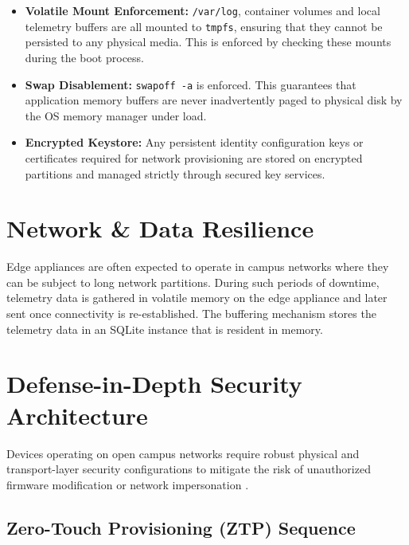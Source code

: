\documentclass[conference]{IEEEtran}
\begin{document}
\begin{itemize}
    \item \textbf{Volatile Mount Enforcement:} \texttt{/var/log}, container volumes and local telemetry buffers are all mounted to \texttt{tmpfs}, ensuring that they cannot be persisted to any physical media. This is enforced by checking these mounts during the boot process.
    \item \textbf{Swap Disablement:} \texttt{swapoff -a} is enforced. This guarantees that application memory buffers are never inadvertently paged to physical disk by the OS memory manager under load.
    \item \textbf{Encrypted Keystore:} Any persistent identity configuration keys or certificates required for network provisioning are stored on encrypted partitions and managed strictly through secured key services.
\end{itemize}

\section{Network \& Data Resilience}

Edge appliances are often expected to operate in campus networks where they can be subject to long network partitions. During such periods of downtime, telemetry data is gathered in volatile memory on the edge appliance and later sent once connectivity is re-established. The buffering mechanism stores the telemetry data in an SQLite instance that is resident in memory.

\section{Defense-in-Depth Security Architecture}

Devices operating on open campus networks require robust physical and transport-layer security configurations to mitigate the risk of unauthorized firmware modification or network impersonation \cite{b16}.

\subsection{Zero-Touch Provisioning (ZTP) Sequence}
\end{document}
